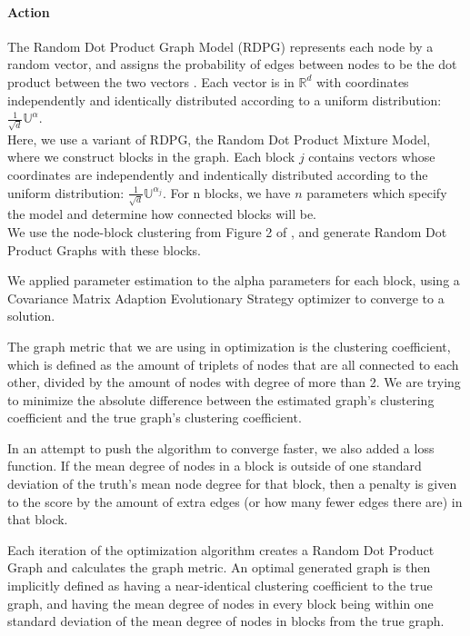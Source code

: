\documentclass[12pt]{article}
\begin{document}
\paragraph{Action}
The Random Dot Product Graph Model (RDPG) represents each node by a random
vector, and assigns the probability of edges between nodes to be the dot product
between the two vectors \cite{young}.
Each vector is in $\mathbb{R}^{d}$ with coordinates independently and
identically distributed according to a uniform distribution:
$\frac{1}{\sqrt{d}}\mathbb{U}^{\alpha}$.\\

Here, we use a variant of RDPG, the Random Dot Product Mixture Model, where we
construct blocks in the graph.  Each block $j$ contains vectors whose 
coordinates are independently and indentically distributed according to the
uniform distribution: $\frac{1}{\sqrt{d}}\mathbb{U}^{\alpha_{j}}$.  For n
blocks, we have $n$ parameters which specify the model and determine how
connected blocks will be.\\

We use the node-block clustering from Figure 2 of \cite{pavlovic}, and generate
Random Dot Product Graphs with these blocks.

We applied parameter estimation to the alpha parameters for each block, using a
Covariance Matrix Adaption Evolutionary Strategy optimizer to converge to a 
solution.

The graph metric that we are using in optimization is the clustering 
coefficient, which is defined \cite{pavlovic} as the amount of triplets of nodes
that are all connected to each other, divided by the amount of nodes with degree
of more  than 2.  We are trying to minimize the absolute difference between the 
estimated graph's clustering coefficient and the true graph's clustering 
coefficient.

In an attempt to push the algorithm to converge faster, we also added a loss
function.  If the mean degree of nodes in a block is outside of one standard
deviation of the truth's mean node degree for that block, then a penalty is
given to the score by the amount of extra edges (or how many fewer edges there
are) in that block.

Each iteration of the optimization algorithm creates a Random Dot Product Graph
and calculates the graph metric.  An optimal generated graph is then implicitly 
defined as having a near-identical clustering coefficient to the true graph, and
having the mean degree of nodes in every block being within one standard
deviation of the mean degree of nodes in blocks from the true graph.
\end{document}
